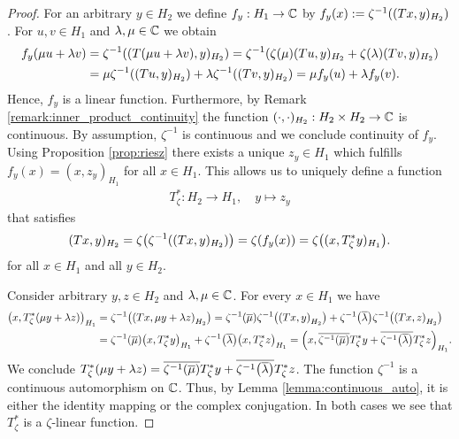 \begin{proof}
	For an arbitrary $y \in H_2$ we define $f_y: H_1 \to \mathbb{C}$ by $f_y (x) := \zeta^{-1}{\left ( (Tx,y)_{H_2} \right )}$. For $u,v \in H_1$ and $\lambda, \mu \in \mathbb{C}$ we obtain
	\begin{align*}
		f_y(\mu u + \lambda v) &= \zeta^{-1}{\left ( (T(\mu u + \lambda v), y)_{H_2} \right )} = \zeta^{-1}{\left ( \zeta(\mu) (Tu, y)_{H_2} + \zeta(\lambda) (Tv, y)_{H_2} \right )} \\
		&= \mu \zeta^{-1}{\left ( (Tu,y)_{H_2} \right )} + \lambda \zeta^{-1}{\left ( (Tv,y)_{H_2} \right )} = \mu f_y(u) + \lambda f_y(v).
	\end{align*}
	Hence, $f_y$ is a linear function. Furthermore, by Remark \ref{remark:inner_product_continuity} the function $(\cdot, \cdot)_{H_2}: H_2 \times H_2 \to \mathbb{C}$ is continuous. By assumption, $\zeta^{-1}$ is continuous and we conclude continuity of $f_y$. Using Proposition \ref{prop:riesz} there exists a unique $z_y \in H_1$ which fulfills $f_y(x) = (x,z_y)_{H_1}$ for all $x \in H_1$. This allows us to uniquely define a function
	\begin{align*}
		T_\zeta^\ast: H_2 \to H_1, \quad y \mapsto z_y
	\end{align*}
	that satisfies
	\begin{align*}
		(Tx,y)_{H_2} = \zeta{\left ( \zeta^{-1}{\left ( (Tx,y)_{H_2} \right )} \right )} = \zeta{\left ( f_y(x) \right )} = \zeta {\left ( (x, T_\zeta^\ast y)_{H_1} \right )}.
	\end{align*}
	for all $x \in H_1$ and all $y \in H_2$.
	
	Consider arbitrary $y,z \in H_2$ and $\lambda, \mu \in \mathbb{C}$. For every $x \in H_1$ we have
	\begin{align*}
		{\left ( x, T_\zeta^\ast {\left ( \mu y + \lambda z \right )} \right )}_{H_1} &= \zeta^{-1}{\left ( {\left ( Tx, \mu y + \lambda z \right )}_{H_2} \right )} = \zeta^{-1}{\left ( \overline{\mu} \right )} \zeta^{-1}{\left ( {\left ( Tx, y \right )}_{H_2} \right )} + \zeta^{-1}{\left ( \overline{\lambda} \right )} \zeta^{-1}{\left ( {\left ( Tx, z \right )}_{H_2} \right )} \\
		&= \zeta^{-1}{\left ( \overline{\mu} \right )} {\left ( x, T_\zeta^\ast y \right )}_{H_1} + \zeta^{-1}{\left ( \overline{\lambda} \right )} {\left ( x, T_\zeta^\ast z \right )}_{H_1} = {\left ( x, \overline{\zeta^{-1}{\left ( \overline{\mu} \right )}}T_\zeta^\ast y + \overline{\zeta^{-1}{\left ( \overline{\lambda} \right )}}T_\zeta^\ast z \right )}_{H_1}.
	\end{align*}
	We conclude $T_\zeta^\ast {\left ( \mu y + \lambda z \right )} = \overline{\zeta^{-1}{\left ( \overline{\mu} \right )}}T_\zeta^\ast y + \overline{\zeta^{-1}{\left ( \overline{\lambda} \right )}}T_\zeta^\ast z$. The function $\zeta^{-1}$ is a continuous automorphism on $\mathbb{C}$. Thus, by Lemma \ref{lemma:continuous_auto}, it is either the identity mapping or the complex conjugation. In both cases we see that $T_\zeta^\ast$ is a $\zeta$-linear function.
\end{proof}


